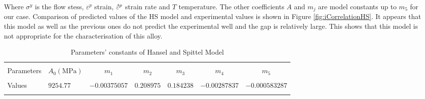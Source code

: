 \documentclass[twoside,english,1p,final,sort&compress]{elsarticle}
\theoremstyle{plain}
\newcommand{\mdot}[1]{\accentset{\mbox{\bfseries .}}{#1}}
\begin{document}
Where $\sigma^y$ is the flow stess, $\varepsilon^p$ strain, $\mdot{\varepsilon}^p$ strain rate and $T$ temperature. The other coefficients $A$ and $m_j$ are model constants up to $m_5$ for our case. Comparison of predicted values of the HS model and experimental values is shown in Figure \ref{fig:iCorrelationHS}. It appears that this model as well as the previous ones do not predict the experimental well and the gap is relatively large. This shows that this model is not appropriate for the characterisation of this alloy.
\begin{table}[h!]
\centering{}
\caption{Parameters' constants of Hansel and Spittel Model}
\begin{tabular}{llccccc}
\hline
&         &             &		   &		 &			   &\\
Parameters&$A_0(\text{MPa})$    &$m_1$        & $m_2$     & $m_3$   & $m_4$       &$m_5$\\
&         &             &		   &	     &	           &\\
\hline
Values&$9254.77$&$-0.00375057$& $0.208975$&$0.184238$&$-0.00287837$&$-0.000583287$\\
\hline
\label{tab: HSparameters}
\end{tabular}
\end{table}
\end{document}
